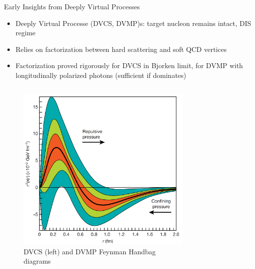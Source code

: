 \documentclass[aspectratio=169]{beamer}
\newcommand*{\myfont}{\fontfamily{lmtt}\selectfont}
\begin{document}
\begin{frame}{Early Insights from Deeply Virtual Processes}
\begin{itemize}
    \item Deeply Virtual Processe (DVCS, DVMP)s: target nucleon remains intact, DIS regime
    \item Relies on factorization between hard scattering and soft QCD vertices
    \item Factorization proved rigorously for DVCS in Bjorken limit, for DVMP with longitudinally polarized photons (sufficient if dominates)
\end{itemize}

\begin{columns}

         \begin{figure}
                        \centering
                        \includegraphics[width=.5\textwidth]{defense/proton_pressure_dist.png}
                      
                        \caption{ DVCS (left) and DVMP Feynman Handbag diagrams\\
                        {\myfont{\tiny  [V. Kubarovsky Nuc Phys B 2011]   }}}
                         
                    \end{figure} 

         \begin{figure}
                        \centering
                       

\end{figure}
\end{columns}
\end{frame}
\end{document}
